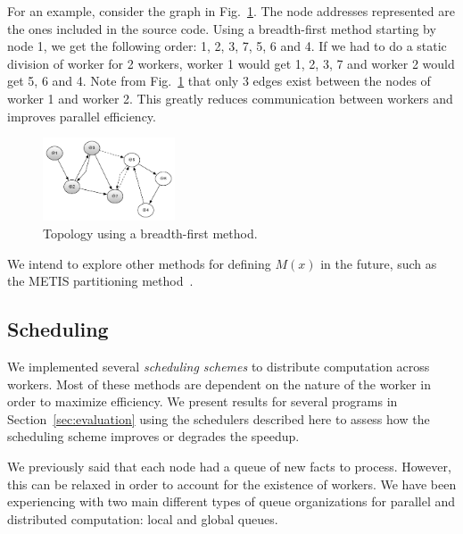 \documentclass[preprint]{sigplanconf}
\begin{document}
For an example, consider the graph in Fig.~\ref{fig:topology1}. The node addresses represented
are the ones included in the source code. Using a breadth-first method starting by node 1,
we get the following order: 1, 2, 3, 7, 5, 6 and 4. If we had to do a static division of worker
for 2 workers, worker 1 would get 1, 2, 3, 7 and worker 2 would get 5, 6 and 4. Note from
Fig.~\ref{fig:topology1} that only 3 edges exist between the nodes of worker 1 and worker 2.
This greatly reduces communication between workers and improves parallel efficiency.

\begin{figure}[ht]
  \centering
    \includegraphics[width=0.35\textwidth]{figures/topology1.pdf}
  \caption{Topology using a breadth-first method.}
  \label{fig:topology1}
\end{figure}

We intend to explore other methods for defining $M(x)$ in the future, such as the METIS
partitioning method~\cite{Karypis:1998:FHQ:305219.305248}.


\subsection{Scheduling}

We implemented several \emph{scheduling schemes} to distribute computation across workers.
Most of these methods are dependent on the nature of the worker in order to maximize efficiency.
We present results for several programs in Section~\ref{sec:evaluation} using the schedulers
described here to assess how the scheduling scheme improves or degrades the speedup.

We previously said that each node had a queue of new facts to process. However, this can be relaxed
in order to account for the existence of workers. We have been experiencing with two main different
types of queue organizations for parallel and distributed computation: local and global queues.
\end{document}
